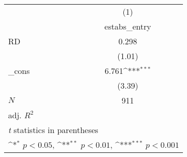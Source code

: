 {
\def\sym#1{\ifmmode^{#1}\else\(^{#1}\)\fi}
\begin{tabular}{l*{1}{c}}
\toprule
            &\multicolumn{1}{c}{(1)}\\
            &\multicolumn{1}{c}{estabs\_entry}\\
\midrule
RD          &       0.298         \\
            &      (1.01)         \\
\addlinespace
\_cons      &       6.761\sym{***}\\
            &      (3.39)         \\
\midrule
\(N\)       &         911         \\
adj. \(R^{2}\)&                     \\
\bottomrule
\multicolumn{2}{l}{\footnotesize \textit{t} statistics in parentheses}\\
\multicolumn{2}{l}{\footnotesize \sym{*} \(p<0.05\), \sym{**} \(p<0.01\), \sym{***} \(p<0.001\)}\\
\end{tabular}
}
